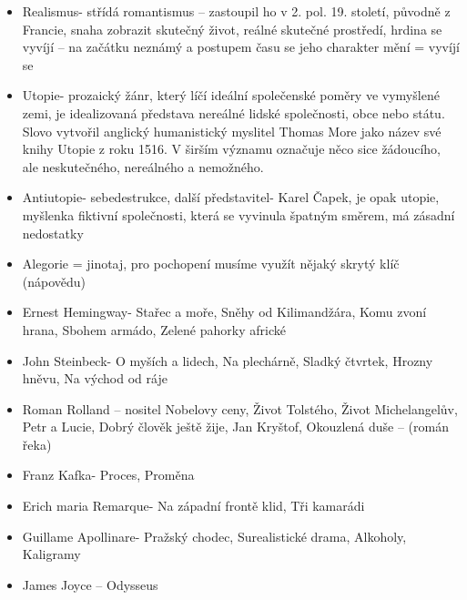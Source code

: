 \documentclass{article}
\begin{document}
\begin{itemize}
    \item Realismus- střídá romantismus – zastoupil ho v 2. pol. 19. století, původně z Francie, snaha 
    zobrazit skutečný život, reálné skutečné prostředí, hrdina se vyvíjí – na začátku neznámý a postupem času 
    se jeho charakter mění = vyvíjí se
    
    \item Utopie- prozaický žánr, který líčí ideální společenské poměry ve vymyšlené zemi, je idealizovaná 
    představa nereálné lidské společnosti, obce nebo státu. Slovo vytvořil anglický humanistický myslitel 
    Thomas More jako název své knihy Utopie z roku 1516. V širším významu označuje něco sice žádoucího, ale 
    neskutečného, nereálného a nemožného.
    
    \item Antiutopie- sebedestrukce, další představitel- Karel Čapek, je opak utopie, myšlenka fiktivní 
    společnosti, která se vyvinula špatným směrem, má zásadní nedostatky
    
    \item Alegorie = jinotaj, pro pochopení musíme využít nějaký skrytý klíč (nápovědu)
    \item Ernest Hemingway- Stařec a moře, Sněhy od Kilimandžára, Komu zvoní hrana, Sbohem armádo, Zelené 
    pahorky africké			
    
    \item John Steinbeck- O myších a lidech, Na plechárně, Sladký čtvrtek, Hrozny hněvu, Na východ od ráje
    \item Roman Rolland – nositel Nobelovy ceny, Život Tolstého, Život Michelangelův, Petr a Lucie, Dobrý 
    člověk ještě žije, Jan Kryštof, Okouzlená duše – (román řeka)
    
    \item Franz Kafka- Proces, Proměna
    \item Erich maria Remarque- Na západní frontě klid, Tři kamarádi
    \item Guillame Apollinare- Pražský chodec, Surealistické drama, Alkoholy, Kaligramy
    \item James Joyce – Odysseus
\end{itemize}
\end{document}

